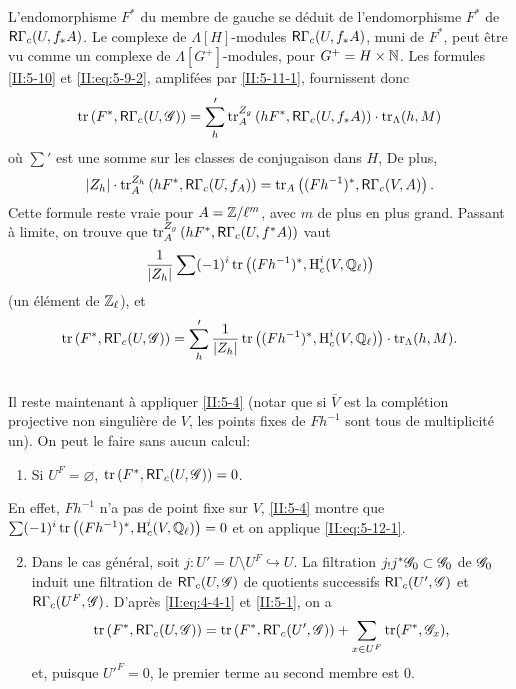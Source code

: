 \documentclass[oneside]{book}
\begin{document}
L'endomorphisme $F^*$ du membre de gauche se d\'eduit de l'endomorphisme 
$F^*$ de $\mathsf{R}\Gamma_c(U,f_* A)$. Le complexe de $\Lambda[H]$-modules 
$\mathsf{R}\Gamma_c(U,f_* A)$, muni de $F^*$, peut \^etre vu comme un complexe de 
$\Lambda[G^+]$-modules, pour $G^+=H\times \mathbb{N}$. Les formules \ref{II:5-10} 
et \eqref{II:eq:5-9-2}, amplif\'ees par \ref{II:5-11-1}, fournissent donc 
\[
  \operatorname{tr}\left(F^*,\mathsf{R}\Gamma_c(U,\mathscr{G})\right) = \sum_h' \operatorname{tr}_A^{Z_g}\left(h F^*,\mathsf{R}\Gamma_c(U,f_* A)\right)\cdot \operatorname{tr}_\Lambda(h,M)
\]
o\`u $\sum'$ est une somme sur les classes de conjugaison dans $H$, De plus, 
\[
  |Z_h|\cdot \operatorname{tr}_A^{Z_h}\left(h F^*,\mathsf{R}\Gamma_c(U,f_ A)\right) = \operatorname{tr}_A\left((F h^{-1})^*,\mathsf{R}\Gamma_c(V,A)\right) \text{.}
\]
Cette formule reste vraie pour $A=\mathbb{Z}/\ell^m$, avec $m$ de plus en plus grand. 
Passant \`a limite, on trouve que 
$\operatorname{tr}_A^{Z_g}\left(h F^*,\mathsf{R}\Gamma_c(U,f^* A)\right)$ vaut 
\[
  \frac{1}{|Z_h|} \sum (-1)^i \operatorname{tr}\left((F h^{-1})^*,\operatorname{H}_c^i(V,\mathbb{Q}_\ell)\right)
\]
(un \'el\'ement de $\mathbb{Z}_\ell$), et
\begin{equation}\label{II:eq:5-12-1}
\operatorname{tr}\left(F^*,\mathsf{R}\Gamma_c(U,\mathscr{G})\right) = \sum_h' \frac{1}{|Z_h|} \operatorname{tr}\left((F h^{-1})^*,\operatorname{H}_c^i(V,\mathbb{Q}_\ell)\right)\cdot \operatorname{tr}_\Lambda(h,M) \text{.} 
\end{equation}





\subsection{}\label{II:5-13}

Il reste maintenant \`a appliquer \ref{II:5-4} (notar que si $\bar V$ est la 
compl\'etion projective non singuli\`ere de $V$, les points fixes de $F h^{-1}$ 
sont tous de multiplicit\'e un). On peut le faire sans aucun calcul: 
\begin{enumerate}[\indent A.]
  \item Si $U^F=\varnothing$, $\operatorname{tr}\left(F^*,\mathsf{R}\Gamma_c(U,\mathscr{G})\right) = 0$. \end{enumerate}

En effet, $F h^{-1}$ n'a pas de point fixe sur $V$, \ref{II:5-4} montre que 
$\sum (-1)^i \operatorname{tr}\left((F h^{-1})^*,\operatorname{H}_c^i(V,\mathbb{Q}_\ell)\right)=0$ et on 
applique \eqref{II:eq:5-12-1}.
\begin{enumerate}[\indent A.]
\setcounter{enumi}{1}
  \item Dans le cas g\'en\'eral, soit $j:U'=U\setminus U^F\hookrightarrow U$. 
    La filtration  $j_! j^* \mathscr{G}_0\subset \mathscr{G}_0$ de $\mathscr{G}_0$ induit une 
    filtration de $\mathsf{R}\Gamma_c(U,\mathscr{G})$ de quotients successifs 
    $\mathsf{R}\Gamma_c(U',\mathscr{G})$ et $\mathsf{R}\Gamma_c(U^F,\mathscr{G})$. D'apr\`es \eqref{II:eq:4-4-1} 
    et \ref{II:5-1}, on a 
    \[
      \operatorname{tr}\left(F^*,\mathsf{R}\Gamma_c(U,\mathscr{G})\right) = \operatorname{tr}\left(F^*,\mathsf{R}\Gamma_c(U',\mathscr{G})\right) + \sum_{x\in U^F} \operatorname{tr}(F^*,\mathscr{G}_x) \text{,}
    \]
    et, puisque ${U'}^F=0$, le premier terme au second membre est $0$. 
\end{enumerate}
\end{document}
